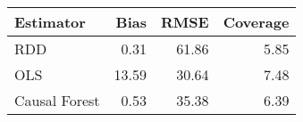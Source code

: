 \begin{table}[ht]
\centering
\begin{tabular}{lrrr}
  \hline
Estimator & Bias & RMSE & Coverage \\ 
  \hline
RDD & 0.31 & 61.86 & 5.85 \\ 
  OLS & 13.59 & 30.64 & 7.48 \\ 
  Causal Forest & 0.53 & 35.38 & 6.39 \\ 
   \hline
\end{tabular}
\end{table}
